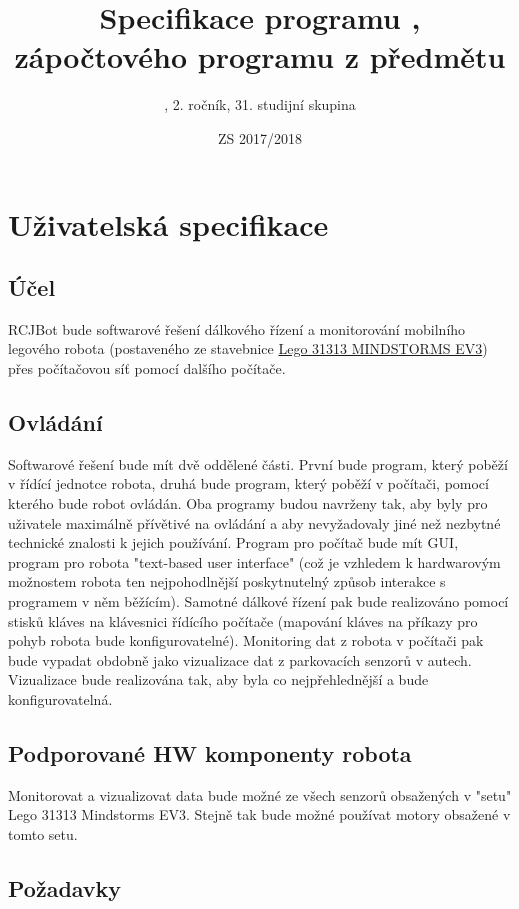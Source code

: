 \documentclass[12pt, ngerman]{article}
\title{Specifikace programu \PROGRAM, zápočtového programu z předmětu \PREDMET}
\date{ZS 2017/2018}
\author{\AUTOR, 2. ročník, 31. studijní skupina}
\begin{document}
\maketitle
\newpage
{}

\section{Uživatelská specifikace}
\subsection{Účel}
RCJBot bude softwarové řešení dálkového řízení a monitorování mobilního legového robota (postaveného ze stavebnice \href{https://www.lego.com/en-us/mindstorms/products/mindstorms-ev3-31313}{Lego 31313 MINDSTORMS EV3}) přes počítačovou síť pomocí  dalšího počítače.

\subsection{Ovládání}
Softwarové řešení bude mít dvě oddělené části. První bude program, který poběží v řídící jednotce robota, druhá bude program, který poběží v počítači, pomocí kterého bude robot ovládán. Oba programy budou navrženy tak, aby byly pro uživatele maximálně přívětivé na ovládání a aby nevyžadovaly jiné než nezbytné technické znalosti k jejich používání. Program pro počítač bude mít GUI, program pro robota "text-based user interface" (což je vzhledem k hardwarovým možnostem robota ten nejpohodlnější poskytnutelný způsob interakce s programem v něm běžícím). Samotné dálkové řízení pak bude realizováno pomocí stisků kláves na klávesnici řídícího počítače (mapování kláves na příkazy pro pohyb robota bude konfigurovatelné). Monitoring dat z robota v počítači pak bude vypadat obdobně jako vizualizace dat z parkovacích senzorů v autech. Vizualizace bude realizována tak, aby byla co nejpřehlednější a bude konfigurovatelná.

\subsection{Podporované HW komponenty robota}
Monitorovat a vizualizovat data bude možné ze všech senzorů obsažených v "setu" Lego 31313 Mindstorms EV3. Stejně tak bude možné používat motory obsažené v tomto setu.

\subsection{Požadavky}
\end{document}
